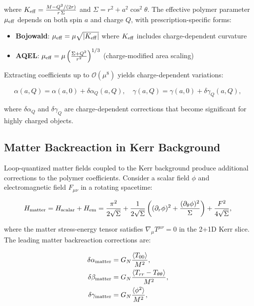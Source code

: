 \documentclass[11pt]{article}
\begin{document}
where $K_{\rm eff} = \frac{M - Q^2/(2r)}{r\,\Sigma}$ and $\Sigma = r^2 + a^2\cos^2\theta$. The effective polymer parameter $\mu_{\rm eff}$ depends on both spin $a$ and charge $Q$, with prescription-specific forms:

\begin{itemize}
\item \textbf{Bojowald}: $\mu_{\rm eff} = \mu \sqrt{|K_{\rm eff}|}$ where $K_{\rm eff}$ includes charge-dependent curvature
\item \textbf{AQEL}: $\mu_{\rm eff} = \mu \left(\frac{\Sigma + Q^2}{r^2}\right)^{1/3}$ (charge-modified area scaling)
\end{itemize}

Extracting coefficients up to $\mathcal{O}(\mu^8)$ yields charge-dependent variations:

\begin{equation}
\alpha(a,Q) = \alpha(a,0) + \delta\alpha_Q(a,Q), \quad \gamma(a,Q) = \gamma(a,0) + \delta\gamma_Q(a,Q),
\end{equation}

where $\delta\alpha_Q$ and $\delta\gamma_Q$ are charge-dependent corrections that become significant for highly charged objects.

\subsection{Matter Backreaction in Kerr Background}

Loop-quantized matter fields coupled to the Kerr background produce additional corrections to the polymer coefficients. Consider a scalar field $\phi$ and electromagnetic field $F_{\mu\nu}$ in a rotating spacetime:

\begin{equation}
H_{\rm matter} = H_{\rm scalar} + H_{\rm em} = \frac{\pi^2}{2\sqrt{\Sigma}} + \frac{1}{2\sqrt{\Sigma}}\left((\partial_r\phi)^2 + \frac{(\partial_\theta\phi)^2}{\Sigma}\right) + \frac{F^2}{4\sqrt{\Sigma}},
\end{equation}

where the matter stress-energy tensor satisfies $\nabla_\mu T^{\mu\nu} = 0$ in the 2+1D Kerr slice. The leading matter backreaction corrections are:

\begin{align}
\delta\alpha_{\rm matter} &= G_N \frac{\langle T_{00} \rangle}{M^2}, \\
\delta\beta_{\rm matter} &= G_N \frac{\langle T_{rr} - T_{\theta\theta} \rangle}{M^2}, \\
\delta\gamma_{\rm matter} &= G_N \frac{\langle \phi^2 \rangle}{M^2},
\end{align}
\end{document}
